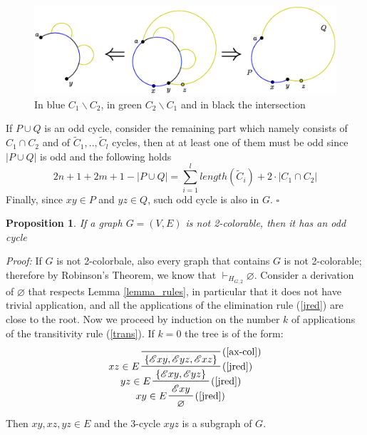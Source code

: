 \documentclass[a4paper,12pt,oneside]{book}
\newtheorem{proposition}[theorem]{Proposition}
\newcommand{\E}{\mathscr{E}}
\newcommand*{\QED}{\hfill\ensuremath{\square}}
\let\emptyset\varnothing
\begin{document}
\begin{figure}[h]
\centering
\includegraphics[scale=0.5]{oddcycles-interceptions.eps}
\caption{In blue $C_1 \backslash C_2 $, in green $C_2\backslash C_1 $ and in black the intersection }
\end{figure}
If $P\cup Q$ is an odd cycle, consider the remaining part which namely consists of $C_1\cap C_2$ and of $\tilde{C}_1,..,\tilde{C}_l$ cycles, then at at least one of them must be odd since $|P\cup Q|$ is odd and the following holds $$2n+1+2m+1-|P\cup Q| = \sum^l_{i=1} length(\tilde{C}_i) + 2\cdot |C_1\cap C_2|   $$
Finally, since $xy\in P$ and $yz\in Q$, such odd cycle is also in $G$. 
\QED



\begin{proposition} \label{mio}
If a graph $G=(V,E)$ is not 2-colorable, then it has an odd cycle
\end{proposition}
\textit{Proof:}
If $G$ is not 2-colorbale, also every graph that contains $G$ is not 2-colorable; therefore by Robinson's Theorem, we know that  $\vdash_{H_{G,2}} \emptyset$. Consider a derivation of $\emptyset$  that respects Lemma \ref{lemma_rules}, in particular that it does not have trivial application, and all the applications of the elimination rule (\ref{jred}) are close to the root.
Now we proceed by induction on the number $k$ of applications of the transitivity rule (\ref{trans}).
If $k=0$ the tree is of the form:
\begin{eqnarray*}
\prftree[r,l]{(\ref{jred})}{$xy \in E$}{
\prftree[r,l]{(\ref{jred})}{$yz \in E$}{
\prftree[r,l]{(\ref{jred})}{$xz \in E$}{
\prftree[r]{(\ref{ax-col})} { }{ \{ \E xy , \E yz, \E xz  \} } } 
{\{ \E xy , \E yz \} } } 
{ \E xy  } }
{ \emptyset }
\end{eqnarray*}
Then $xy,xz,yz \in E$ and the 3-cycle $xyz$ is a subgraph of $G$.
 
\end{document}

